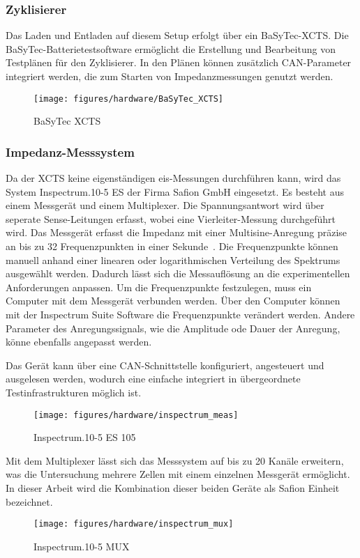 \subsubsection{Zyklisierer}
Das Laden und Entladen auf diesem Setup erfolgt über ein BaSyTec-XCTS\@.
Die BaSyTec-Batterietestsoftware ermöglicht die Erstellung und Bearbeitung von Testplänen für den Zyklisierer.
In den Plänen können zusätzlich CAN-Parameter integriert werden, die zum Starten von Impedanzmessungen genutzt werden.
\begin{figure} [H]
    \centering
    \texttt{[image: figures/hardware/BaSyTec\_XCTS]}
    \caption{BaSyTec XCTS~\cite{basytec}}
    \label{fig:xcts}
\end{figure}

\subsubsection{Impedanz-Messsystem}
Da der XCTS keine eigenständigen \gls{eis}-Messungen durchführen kann, wird das System Inspectrum.10-5 ES der
Firma Safion GmbH eingesetzt.
Es besteht aus einem Messgerät und einem Multiplexer.
Die Spannungsantwort wird über seperate Sense-Leitungen erfasst, wobei eine Vierleiter-Messung durchgeführt wird.
Das Messgerät erfasst die Impedanz mit einer Multisine-Anregung präzise an bis zu 32 Frequenzpunkten in einer Sekunde~\cite{inspectrum}.
Die Frequenzpunkte können manuell anhand einer linearen oder logarithmischen Verteilung des Spektrums ausgewählt werden.
Dadurch lässt sich die Messauflösung an die experimentellen Anforderungen anpassen.
Um die Frequenzpunkte festzulegen, muss ein Computer mit dem Messgerät verbunden werden.
Über den Computer können mit der Inspectrum Suite Software die Frequenzpunkte verändert werden.
Andere Parameter des Anregungssignals, wie die Amplitude ode Dauer der Anregung, könne ebenfalls angepasst werden.

Das Gerät kann über eine CAN-Schnittstelle konfiguriert, angesteuert und ausgelesen werden, wodurch eine einfache
integriert in übergeordnete Testinfrastrukturen möglich ist.
\begin{figure} [H]
    \centering
    \texttt{[image: figures/hardware/inspectrum\_meas]}
    \caption{Inspectrum.10-5 ES 105~\cite{inspectrum}}
    \label{fig:inspectrum_meas}
\end{figure}
Mit dem Multiplexer lässt sich das Messsystem auf bis zu 20 Kanäle erweitern, was die Untersuchung mehrere Zellen mit
einem einzelnen Messgerät ermöglicht.
In dieser Arbeit wird die Kombination dieser beiden Geräte als Safion Einheit bezeichnet.
\begin{figure} [H]
    \centering
    \texttt{[image: figures/hardware/inspectrum\_mux]}
    \caption{Inspectrum.10-5 MUX~\cite{inspectrum}}
    \label{fig:inspectrum_mux}
\end{figure}

